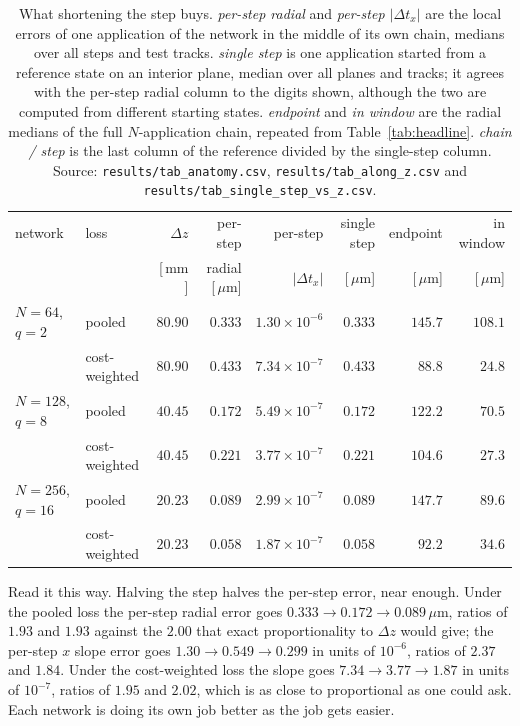 \documentclass[11pt,a4paper]{article}
\newcommand{\um}{\ensuremath{\,\mu\mathrm{m}}}
\newcommand{\mm}{\ensuremath{\,\mathrm{mm}}}
\begin{document}
\begin{table}[tbp]
  \centering
  \caption{What shortening the step buys. \emph{per-step radial} and
  \emph{per-step $|\Delta t_x|$} are the local errors of one application of the
  network in the middle of its own chain, medians over all steps and test
  tracks. \emph{single step} is one application started from a reference state
  on an interior plane, median over all planes and tracks; it agrees with the
  per-step radial column to the digits shown, although the two are computed
  from different starting states. \emph{endpoint} and \emph{in window} are the
  radial medians of the full $N$-application chain, repeated from
  Table~\ref{tab:headline}. \emph{chain / step} is the last column of the
  reference divided by the single-step column. Source:
  \texttt{results/tab\_anatomy.csv}, \texttt{results/tab\_along\_z.csv} and
  \texttt{results/tab\_single\_step\_vs\_z.csv}.}
  \label{tab:steps}
  \footnotesize
  \setlength{\tabcolsep}{5pt}
  \begin{tabular}{llrrrrrr}
    \toprule
    network & loss & $\Delta z$ & per-step & per-step & single step &
    endpoint & in window \\
    & & [\!\mm] & radial [\!\um] & $|\Delta t_x|$ & [\!\um] & [\!\um] & [\!\um] \\
    \midrule
    $N = 64$, $q = 2$   & pooled        & $80.90$ & $0.333$ & $1.30\times10^{-6}$ & $0.333$ & $145.7$ & $108.1$ \\
                        & cost-weighted & $80.90$ & $0.433$ & $7.34\times10^{-7}$ & $0.433$ & $88.8$  & $24.8$ \\
    \addlinespace
    $N = 128$, $q = 8$  & pooled        & $40.45$ & $0.172$ & $5.49\times10^{-7}$ & $0.172$ & $122.2$ & $70.5$ \\
                        & cost-weighted & $40.45$ & $0.221$ & $3.77\times10^{-7}$ & $0.221$ & $104.6$ & $27.3$ \\
    \addlinespace
    $N = 256$, $q = 16$ & pooled        & $20.23$ & $0.089$ & $2.99\times10^{-7}$ & $0.089$ & $147.7$ & $89.6$ \\
                        & cost-weighted & $20.23$ & $0.058$ & $1.87\times10^{-7}$ & $0.058$ & $92.2$  & $34.6$ \\
    \bottomrule
  \end{tabular}
\end{table}

Read it this way. Halving the step halves the per-step error, near enough. Under
the pooled loss the per-step radial error goes $0.333 \to 0.172 \to
0.089\um$, ratios of $1.93$ and $1.93$ against the $2.00$ that exact
proportionality to $\Delta z$ would give; the per-step $x$ slope error goes
$1.30 \to 0.549 \to 0.299$ in units of $10^{-6}$, ratios of $2.37$ and $1.84$.
Under the cost-weighted loss the slope goes $7.34 \to 3.77 \to 1.87$ in units of
$10^{-7}$, ratios of $1.95$ and $2.02$, which is as close to proportional as one
could ask. Each network is doing its own job better as the job gets easier.
\end{document}
